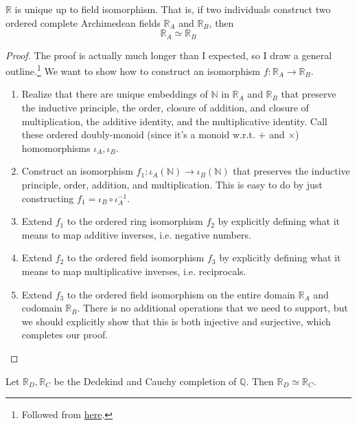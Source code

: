 \documentclass{article}
\begin{document}
      \begin{theorem}[Uniqueness]
        $\mathbb{R}$ is unique up to field isomorphism. That is, if two individuals construct two ordered complete Archimedean fields $\mathbb{R}_A$ and $\mathbb{R}_B$, then 
        \begin{equation}
          \mathbb{R}_A \simeq \mathbb{R}_B
        \end{equation}
      \end{theorem}  
      \begin{proof}
        The proof is actually much longer than I expected, so I draw a general outline.\footnote{Followed from \href{https://math.ucr.edu/~res/math205A/uniqreals.pdf}{here}.} We want to show how to construct an isomorphism $f: \mathbb{R}_A \rightarrow \mathbb{R}_B$. 
        \begin{enumerate}
          \item Realize that there are unique embeddings of $\mathbb{N}$ in $\mathbb{R}_A$ and $\mathbb{R}_B$ that preserve the inductive principle, the order, closure of addition, and closure of multiplication, the additive identity, and the multiplicative identity. Call these ordered doubly-monoid (since it's a monoid w.r.t. $+$ and $\times$) homomorphisms $\iota_A, \iota_B$. 
          \item Construct an isomorphism $f_1: \iota_A(\mathbb{N}) \rightarrow \iota_B(\mathbb{N})$ that preserves the inductive principle, order, addition, and multiplication. This is easy to do by just constructing $f_1 = \iota_B \circ \iota_A^{-1}$. 
          \item Extend $f_1$ to the ordered ring isomorphism $f_2$ by explicitly defining what it means to map additive inverses, i.e. negative numbers. 
          \item Extend $f_2$ to the ordered field isomorphism $f_3$ by explicitly defining what it means to map multiplicative inverses, i.e. reciprocals. 
          \item Extend $f_3$ to the ordered field isomorphism on the entire domain $\mathbb{R}_A$ and codomain $\mathbb{R}_B$. There is no additional operations that we need to support, but we should explicitly show that this is both injective and surjective, which completes our proof. 
        \end{enumerate}
      \end{proof}

      \begin{corollary}
        Let $\mathbb{R}_D, \mathbb{R}_C$ be the Dedekind and Cauchy completion of $\mathbb{Q}$. Then $\mathbb{R}_D \simeq \mathbb{R}_C$. 
      \end{corollary}
\end{document}
